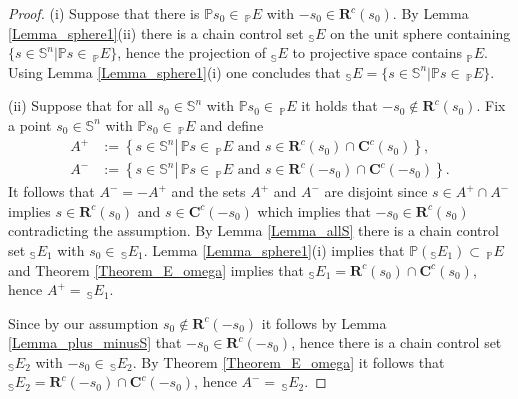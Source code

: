 \documentclass[preprint,12pt]{elsarticle}
\begin{document}
\begin{proof}
(i) Suppose that there is $\mathbb{P}s_{0}\in\,_{\mathbb{P}}E$ with $-s_{0}%
\in\mathbf{R}^{c}(s_{0})$. By Lemma \ref{Lemma_sphere1}(ii) there is a chain
control set $_{\mathbb{S}}E$ on the unit sphere containing $\{s\in
\mathbb{S}^{n}\left\vert \mathbb{P}s\in\,_{\mathbb{P}}E\right.  \}$, hence the
projection of $_{\mathbb{S}}E$ to projective space contains $_{\mathbb{P}}E$.
Using Lemma \ref{Lemma_sphere1}(i) one concludes that $_{\mathbb{S}}%
E=\{s\in\mathbb{S}^{n}\left\vert \mathbb{P}s\in\,_{\mathbb{P}}E\right.  \}$.

(ii) Suppose that for all $s_{0}\in\mathbb{S}^{n}$ with $\mathbb{P}s_{0}%
\in\,_{\mathbb{P}}E$ it holds that $-s_{0}\not \in \mathbf{R}^{c}(s_{0})$. Fix
a point $s_{0}\in\mathbb{S}^{n}$ with $\mathbb{P}s_{0}\in\,_{\mathbb{P}}E$ and
define%
\begin{align*}
A^{+}  &  :=\left\{  s\in\mathbb{S}^{n}\left\vert \,\mathbb{P}s\in
\,_{\mathbb{P}}E\text{ and }s\in\mathbf{R}^{c}(s_{0})\cap\mathbf{C}^{c}%
(s_{0})\right.  \right\}  ,\\
A^{-}  &  :=\left\{  s\in\mathbb{S}^{n}\left\vert \,\mathbb{P}s\in
\,_{\mathbb{P}}E\text{ and }s\in\mathbf{R}^{c}(-s_{0})\cap\mathbf{C}%
^{c}(-s_{0})\right.  \right\}  .
\end{align*}
It follows that $A^{-}=-A^{+}$ and the sets $A^{+}$ and $A^{-}$ are disjoint
since $s\in A^{+}\cap A^{-}$ implies $s\in\mathbf{R}^{c}(s_{0})$ and
$s\in\mathbf{C}^{c}(-s_{0})$ which implies that $-s_{0}\in\mathbf{R}^{c}%
(s_{0})$ contradicting the assumption. By Lemma \ref{Lemma_allS} there is a
chain control set $_{\mathbb{S}}E_{1}$ with $s_{0}\in\,_{\mathbb{S}}E_{1}$.
Lemma \ref{Lemma_sphere1}(i)\textbf{ }implies that $\mathbb{P}(_{\mathbb{S}%
}E_{1})\subset\,_{\mathbb{P}}E$ and Theorem \ref{Theorem_E_omega} implies that
$_{\mathbb{S}}E_{1}=\mathbf{R}^{c}(s_{0})\cap\mathbf{C}^{c}(s_{0})$, hence
$A^{+}=\,_{\mathbb{S}}E_{1}$.

Since by our assumption $s_{0}\not \in \mathbf{R}^{c}(-s_{0})$ it follows by
Lemma \ref{Lemma_plus_minusS} that $-s_{0}\in\mathbf{R}^{c}(-s_{0})$, hence
there is a chain control set $_{\mathbb{S}}E_{2}$ with $-s_{0}\in
\,_{\mathbb{S}}E_{2}$. By Theorem \ref{Theorem_E_omega} it follows that
$_{\mathbb{S}}E_{2}=\mathbf{R}^{c}(-s_{0})\cap\mathbf{C}^{c}(-s_{0})$, hence
$A^{-}=\,_{\mathbb{S}}E_{2}$.


\end{proof}
\end{document}
